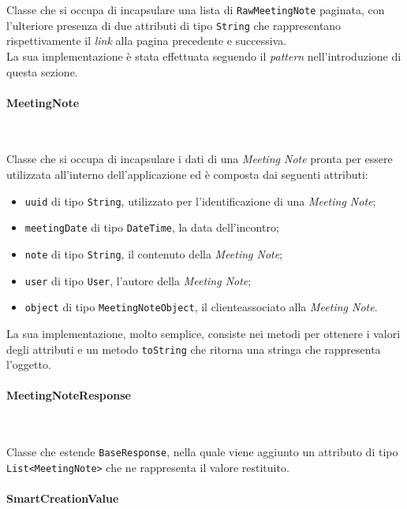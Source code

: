 \noindent Classe che si occupa di incapsulare una lista di \lstinline{RawMeetingNote} paginata, con l'ulteriore presenza di due attributi di tipo \lstinline{String} che rappresentano rispettivamente il \emph{link} alla pagina precedente e successiva.\\
La sua implementazione è stata effettuata seguendo il \emph{pattern} nell'introduzione di questa sezione.

\paragraph*{MeetingNote} ~ \\
\label{par:meeting-note}

\noindent Classe che si occupa di incapsulare i dati di una \emph{Meeting Note} pronta per essere utilizzata all'interno dell'applicazione ed è composta dai seguenti attributi:
\begin{itemize}
    \item \lstinline{uuid} di tipo \lstinline{String}, utilizzato per l'identificazione di una \emph{Meeting Note};
    \item \lstinline{meetingDate} di tipo \lstinline{DateTime}\cite{site:date-time}, la data dell'incontro;
    \item \lstinline{note} di tipo \lstinline{String}, il contenuto della \emph{Meeting Note};
    \item \lstinline{user} di tipo \lstinline{User}, l'autore della \emph{Meeting Note};
    \item \lstinline{object} di tipo \lstinline{MeetingNoteObject}, il \gls{cliente}\glsoccur associato alla \emph{Meeting Note}.
\end{itemize}
La sua implementazione, molto semplice, consiste nei metodi per ottenere i valori degli attributi e un metodo \lstinline{toString} che ritorna una stringa che rappresenta l'oggetto.

\paragraph*{MeetingNoteResponse} ~ \\
\label{par:meeting-note-response}

\noindent Classe che estende \lstinline{BaseResponse}, nella quale viene aggiunto un attributo di tipo \lstinline{List<MeetingNote>} che ne rappresenta il valore restituito.

\paragraph*{SmartCreationValue} ~ \\
\label{par:smart-creation-value}

